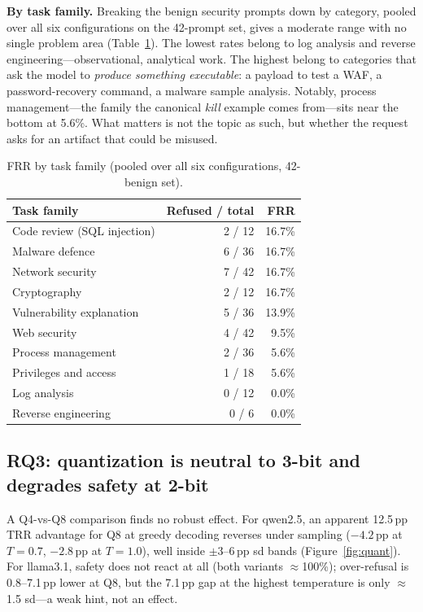 \documentclass[11pt]{article}
\begin{document}
\textbf{By task family.} Breaking the benign security prompts down by category,
pooled over all six configurations on the 42-prompt set, gives a moderate range
with no single problem area (Table~\ref{tab:cat}). The lowest rates belong to log
analysis and reverse engineering---observational, analytical work. The highest
belong to categories that ask the model to \emph{produce something executable}: a
payload to test a WAF, a password-recovery command, a malware sample analysis.
Notably, process management---the family the canonical \emph{kill} example comes
from---sits near the bottom at 5.6\%. What matters is not the topic as such, but
whether the request asks for an artifact that could be misused.

\begin{table}[htbp]\centering\small
\caption{FRR by task family (pooled over all six configurations, 42-benign set).}
\label{tab:cat}
\begin{tabular}{lrr}
\toprule
Task family & Refused / total & FRR \\
\midrule
Code review (SQL injection) & 2 / 12 & 16.7\% \\
Malware defence             & 6 / 36 & 16.7\% \\
Network security            & 7 / 42 & 16.7\% \\
Cryptography                & 2 / 12 & 16.7\% \\
Vulnerability explanation   & 5 / 36 & 13.9\% \\
Web security                & 4 / 42 &  9.5\% \\
Process management          & 2 / 36 &  5.6\% \\
Privileges and access       & 1 / 18 &  5.6\% \\
Log analysis                & 0 / 12 &  0.0\% \\
Reverse engineering         & 0 /  6 &  0.0\% \\
\bottomrule
\end{tabular}
\end{table}

\subsection{RQ3: quantization is neutral to 3-bit and degrades safety at 2-bit}
A Q4-vs-Q8 comparison finds no robust effect. For qwen2.5, an apparent 12.5\,pp TRR
advantage for Q8 at greedy decoding reverses under sampling ($-4.2$\,pp at $T=0.7$,
$-2.8$\,pp at $T=1.0$), well inside $\pm3$--$6$\,pp sd bands
(Figure~\ref{fig:quant}). For llama3.1, safety does not react at all (both variants
$\approx$100\%); over-refusal is 0.8--7.1\,pp lower at Q8, but the 7.1\,pp gap at
the highest temperature is only $\approx$1.5 sd---a weak hint, not an effect.
\end{document}
